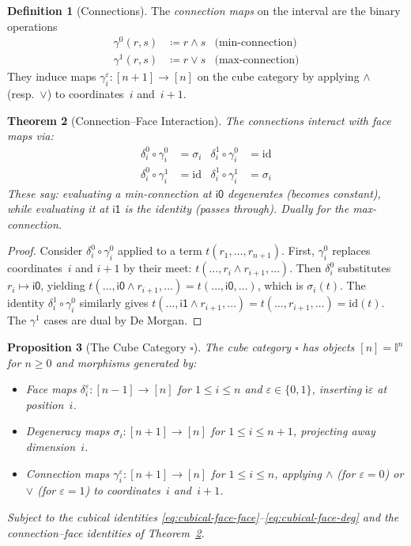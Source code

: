 \documentclass[11pt,a4paper]{report}
\theoremstyle{definition}
\newtheorem{definition}{Definition}[chapter]
\theoremstyle{plain}
\newtheorem{theorem}[definition]{Theorem}
\newtheorem{proposition}[definition]{Proposition}
\newcommand{\interval}{\mathbb{I}}
\begin{document}
\begin{definition}[Connections]
\label{def:connections}
The \emph{connection maps} on the interval are the binary operations
\begin{align}
  \gamma^0(r, s) &\coloneqq r \land s & \text{(min-connection)} \\
  \gamma^1(r, s) &\coloneqq r \lor s & \text{(max-connection)}
\end{align}
They induce maps $\gamma_i^\varepsilon : [n+1] \to [n]$ on the cube
category by applying $\land$ (resp.\ $\lor$) to coordinates~$i$
and~$i+1$.
\end{definition}

\begin{theorem}[Connection--Face Interaction]
\label{thm:connection-face}
The connections interact with face maps via:
\begin{align}
  \delta_i^0 \circ \gamma_i^0 &= \sigma_i &
  \delta_i^1 \circ \gamma_i^0 &= \mathrm{id} \\
  \delta_i^0 \circ \gamma_i^1 &= \mathrm{id} &
  \delta_i^1 \circ \gamma_i^1 &= \sigma_i
\end{align}
These say: evaluating a min-connection at $\mathsf{i0}$ degenerates
(becomes constant), while evaluating it at $\mathsf{i1}$ is the identity
(passes through).  Dually for the max-connection.
\end{theorem}

\begin{proof}
Consider $\delta_i^0 \circ \gamma_i^0$ applied to a term $t(r_1,
\ldots, r_{n+1})$.  First, $\gamma_i^0$ replaces coordinates~$i$ and
$i+1$ by their meet: $t(\ldots, r_i \land r_{i+1}, \ldots)$.  Then
$\delta_i^0$ substitutes $r_i \mapsto \mathsf{i0}$, yielding
$t(\ldots, \mathsf{i0} \land r_{i+1}, \ldots) = t(\ldots, \mathsf{i0},
\ldots)$, which is $\sigma_i(t)$.  The identity $\delta_i^1 \circ
\gamma_i^0$ similarly gives $t(\ldots, \mathsf{i1} \land r_{i+1},
\ldots) = t(\ldots, r_{i+1}, \ldots) = \mathrm{id}(t)$.  The
$\gamma^1$ cases are dual by De Morgan.
\end{proof}

\begin{proposition}[The Cube Category $\square$]
\label{prop:cube-category}
The \emph{cube category} $\square$ has objects $[n] = \interval^n$
for $n \geq 0$ and morphisms generated by:
\begin{itemize}
  \item Face maps $\delta_i^\varepsilon : [n-1] \to [n]$ for $1 \leq i \leq n$
    and $\varepsilon \in \{0, 1\}$, inserting $\mathsf{i}\varepsilon$ at
    position~$i$.
  \item Degeneracy maps $\sigma_i : [n+1] \to [n]$ for $1 \leq i \leq n+1$,
    projecting away dimension~$i$.
  \item Connection maps $\gamma_i^\varepsilon : [n+1] \to [n]$ for
    $1 \leq i \leq n$, applying $\land$ (for $\varepsilon = 0$) or $\lor$
    (for $\varepsilon = 1$) to coordinates~$i$ and~$i+1$.
\end{itemize}
Subject to the cubical identities
\eqref{eq:cubical-face-face}--\eqref{eq:cubical-face-deg} and the
connection--face identities of Theorem~\ref{thm:connection-face}.
\end{proposition}
\end{document}
